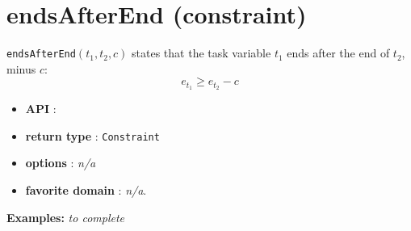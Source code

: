 \section{endsAfterEnd (constraint)}\label{endsafterend:endsafterendconstraint}\hypertarget{endsafterend:endsafterendconstraint}{}
\begin{notedef}
\texttt{endsAfterEnd}$(t_1,t_2,c)$ states that the task variable $t_1$ ends after the end of $t_2$, minus $c$:
  $$e_{t_{1}} \ge e_{t_{2}} - c$$
\end{notedef}

\begin{itemize}
	\item \textbf{API} :
	\item \textbf{return type} : \texttt{Constraint}
	\item \textbf{options} : \emph{n/a}
	\item \textbf{favorite domain} : \emph{n/a}.
\end{itemize}

\textbf{Examples:}
%
\emph{to complete}
